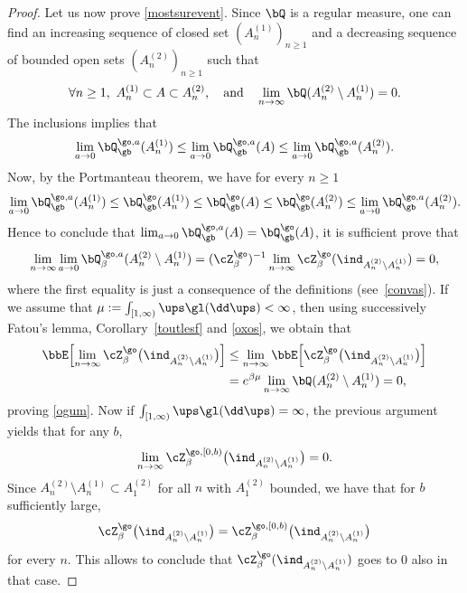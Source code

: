 \begin{proof}
Let us now prove \eqref{mostsurevent}.
Since $\bQ$ is a regular measure, one can find an increasing sequence of closed set $(A^{(1)}_n)_{n\ge 1}$ and a decreasing
sequence of bounded open sets $(A^{(2)}_n)_{n\ge 1}$ such that
\begin{equation}
\label{oxos}
\forall n\ge 1,\ A^{(1)}_n\subset A\subset A^{(2)}_n, \quad \text{and} \quad \lim_{n\to \infty}
\bQ (A^{(2)}_n\setminus A^{(1)}_n)=0.
\end{equation}
The inclusions implies that
\begin{equation}
\lim_{a\to 0}\bQ^{\go,a}_{\gb}(A^{(1)}_n) \le \lim_{a\to 0}\bQ^{\go,a}_{\gb}(A)\le \lim_{a\to 0}\bQ^{\go,a}_{\gb}(A^{(2)}_n).
\end{equation}
Now, by the Portmanteau theorem, we have for every $n\ge 1$
\begin{equation}\label{oxossi}
\lim_{a\to 0}\bQ^{\go,a}_{\gb}(A^{(1)}_n)\le \bQ^{\go}_{\gb}(A^{(1)}_n)\le \bQ^{\go}_{\gb}(A)\le \bQ^{\go}_{\gb}(A^{(2)}_n)\le
\lim_{a\to 0}\bQ^{\go,a}_{\gb}(A^{(2)}_n).
\end{equation}
Hence to conclude that $\lim_{a\to 0}\bQ^{\go,a}_{\gb}(A)= \bQ^{\go}_{\gb}(A)$, it is sufficient prove that
\begin{equation}\label{ogum}
\lim_{n\to \infty}\lim_{a\to 0} \bQ^{\go,a}_{\beta} (A^{(2)}_n\setminus A^{(1)}_n)=(\cZ^{\go}_\beta)^{-1} \lim_{n\to \infty} \cZ^{\go}_\beta(\ind_{A^{(2)}_n\setminus A^{(1)}_n})=0,
\end{equation}
where the first equality is just a consequence of the definitions (see~\eqref{convas}).
If we assume that $\mu:=\int_{[1,\infty)} \ups \gl(\dd \ups)<\infty$, then using successively Fatou's lemma, Corollary~\ref{toutlesf} and \eqref{oxos}, we obtain that
\begin{equation}\label{okok}
\begin{aligned}
\bbE \Bigl[ \lim_{n\to \infty}\cZ^{\go}_\beta \bigl(\ind_{A^{(2)}_n\setminus A^{(1)}_n} \bigr) \Bigr]&\le \lim_{n\to \infty} \bbE \Bigl[ \cZ^{\go}_\beta \bigl(\ind_{A^{(2)}_n\setminus A^{(1)}_n} \bigr) \Bigr]\\
&= e^{\beta \mu} \lim_{n\to \infty}\bQ(A^{(2)}_n\setminus A^{(1)}_n)=0,
\end{aligned}
\end{equation}
proving \eqref{ogum}.
Now if $\int_{[1,\infty)} \ups \gl(\dd \ups)=\infty$, the previous argument yields that for any $b$,
\[
\lim_{n\to \infty}\cZ^{\go,[0,b)}_\beta \bigl(\ind_{A^{(2)}_n\setminus A^{(1)}_n}\bigr)=0.
\]
Since $A^{(2)}_n\setminus A^{(1)}_n\subset A^{(2)}_1$ for all $n$ with $A_1^{(2)}$ bounded, we have that for $b$ sufficiently large,
\[
\cZ^{\go}_\beta\bigl(\ind_{A^{(2)}_n\setminus A^{(1)}_n}\bigr)=\cZ^{\go,[0,b)}_\beta\bigl(\ind_{A^{(2)}_n\setminus A^{(1)}_n} \bigr)
\]
for every $n$. This allows to conclude that $\cZ^{\go}_\beta(\ind_{A^{(2)}_n\setminus A^{(1)}_n})$ goes to $0$ also in that case.
\end{proof}

